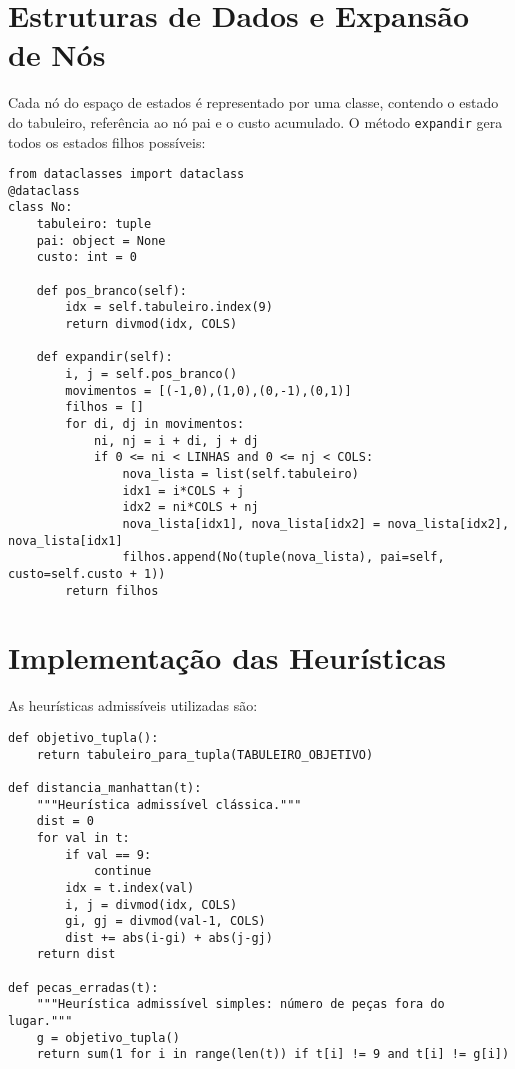 \section{Estruturas de Dados e Expansão de Nós}  
Cada nó do espaço de estados é representado por uma classe, contendo o estado do tabuleiro, referência ao nó pai e o custo acumulado. O método \texttt{expandir} gera todos os estados filhos possíveis:  
\begin{verbatim}  
from dataclasses import dataclass  
@dataclass  
class No:  
    tabuleiro: tuple  
    pai: object = None  
    custo: int = 0  
  
    def pos_branco(self):  
        idx = self.tabuleiro.index(9)  
        return divmod(idx, COLS)  
  
    def expandir(self):  
        i, j = self.pos_branco()  
        movimentos = [(-1,0),(1,0),(0,-1),(0,1)]  
        filhos = []  
        for di, dj in movimentos:  
            ni, nj = i + di, j + dj  
            if 0 <= ni < LINHAS and 0 <= nj < COLS:  
                nova_lista = list(self.tabuleiro)  
                idx1 = i*COLS + j  
                idx2 = ni*COLS + nj  
                nova_lista[idx1], nova_lista[idx2] = nova_lista[idx2], nova_lista[idx1]  
                filhos.append(No(tuple(nova_lista), pai=self, custo=self.custo + 1))  
        return filhos  
\end{verbatim}  
  
\section{Implementação das Heurísticas}  
As heurísticas admissíveis utilizadas são:  
\begin{verbatim}  
def objetivo_tupla():  
    return tabuleiro_para_tupla(TABULEIRO_OBJETIVO)  
  
def distancia_manhattan(t):  
    """Heurística admissível clássica."""  
    dist = 0  
    for val in t:  
        if val == 9:  
            continue  
        idx = t.index(val)  
        i, j = divmod(idx, COLS)  
        gi, gj = divmod(val-1, COLS)  
        dist += abs(i-gi) + abs(j-gj)  
    return dist  
  
def pecas_erradas(t):  
    """Heurística admissível simples: número de peças fora do lugar."""  
    g = objetivo_tupla()  
    return sum(1 for i in range(len(t)) if t[i] != 9 and t[i] != g[i])  
\end{verbatim}  
  
